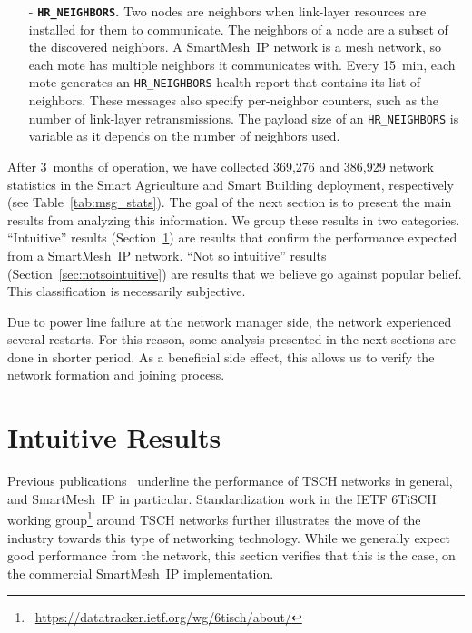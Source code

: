 \documentclass{elsarticle}
\newcommand{\smip}                {SmartMesh~IP\xspace}
\newcommand{\building}            {Smart Building\xspace}
\newcommand{\agri}                {Smart Agriculture\xspace}
\newcommand{\HRNEIGHBORS}         {{\tt HR\_NEIGHBORS}\xspace}
\newcommand{\PEACHNUMSTATS}       {369,276\xspace}
\newcommand{\EVANUMSTATS}         {386,929\xspace}
\begin{document}
\begin{itemize}
    \item[-] \textbf{\HRNEIGHBORS.}
        Two nodes are neighbors when link-layer resources are installed for them to communicate.
        The neighbors of a node are a subset of the discovered neighbors.
        A \smip network is a mesh network, so each mote has multiple neighbors it communicates with.
        Every 15~min, each mote generates an \HRNEIGHBORS health report that contains its list of neighbors.
        These messages also specify per-neighbor counters, such as the number of link-layer retransmissions.
        The payload size of an \HRNEIGHBORS is variable as it depends on the number of neighbors used.
\end{itemize}


After 3~months of operation, we have collected \PEACHNUMSTATS and \EVANUMSTATS network statistics in the \agri and \building deployment, respectively (see Table~\ref{tab:msg_stats}).
The goal of the next section is to present the main results from analyzing this information.
We group these results in two categories.
``Intuitive'' results (Section~\ref{sec:intuitive}) are results that confirm the performance expected from a \smip network.
``Not so intuitive'' results (Section~\ref{sec:notsointuitive}) are results that we believe go against popular belief.
This classification is necessarily subjective.

Due to power line failure at the network manager side, the network experienced several restarts.
For this reason, some analysis presented in the next sections are done in shorter period.
As a beneficial side effect, this allows us to verify the network formation and joining process.

\section{Intuitive Results}
\label{sec:intuitive}


Previous publications~\cite{watteyne16peach,watteyne10mitigating,watteyne09reliability,watteyne15industrial} underline the performance of TSCH networks in general, and \smip in particular.
Standardization work in the IETF 6TiSCH working group\footnote{~\url{https://datatracker.ietf.org/wg/6tisch/about/}} around TSCH networks further illustrates the move of the industry towards this type of networking technology.
While we generally expect good performance from the network, this section verifies that this is the case, on the commercial \smip implementation.
\end{document}

